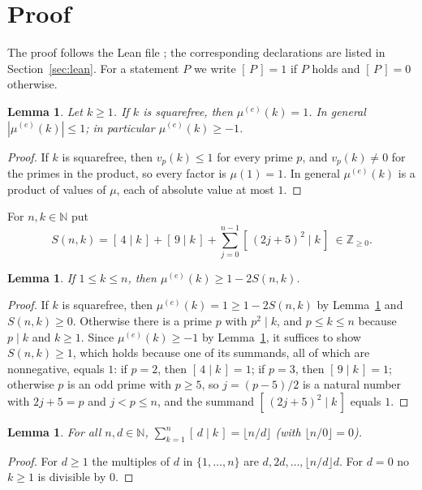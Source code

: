 \documentclass[11pt]{amsart}
\theoremstyle{plain}
\newtheorem{lemma}[theorem]{Lemma}
\theoremstyle{definition}
\newcommand{\N}{\mathbb{N}}
\newcommand{\Z}{\mathbb{Z}}
\newcommand{\mue}{\mu^{(e)}}
\newcommand{\ind}[1]{[\,#1\,]}
\begin{document}
\section{Proof}\label{sec:proof}

The proof follows the Lean file ; the corresponding declarations are listed in Section~\ref{sec:lean}. For a statement $P$ we write $\ind{P}=1$ if $P$ holds and $\ind{P}=0$ otherwise.

\begin{lemma}\label{lem:values}
Let $k\ge1$. If $k$ is squarefree, then $\mue(k)=1$. In general $|\mue(k)|\le1$; in particular $\mue(k)\ge-1$.
\end{lemma}

\begin{proof}
If $k$ is squarefree, then $v_p(k)\le1$ for every prime $p$, and $v_p(k)\ne0$ for the primes in the product, so every factor is $\mu(1)=1$. In general $\mue(k)$ is a product of values of $\mu$, each of absolute value at most $1$.
\end{proof}

For $n,k\in\N$ put
\[
  S(n,k)=\ind{4\mid k}+\ind{9\mid k}+\sum_{j=0}^{n-1}\ind{(2j+5)^2\mid k}\ \in\Z_{\ge0}.
\]

\begin{lemma}\label{lem:pointwise}
If $1\le k\le n$, then $\mue(k)\ge 1-2S(n,k)$.
\end{lemma}

\begin{proof}
If $k$ is squarefree, then $\mue(k)=1\ge1-2S(n,k)$ by Lemma~\ref{lem:values} and $S(n,k)\ge0$. Otherwise there is a prime $p$ with $p^2\mid k$, and $p\le k\le n$ because $p\mid k$ and $k\ge1$. Since $\mue(k)\ge-1$ by Lemma~\ref{lem:values}, it suffices to show $S(n,k)\ge1$, which holds because one of its summands, all of which are nonnegative, equals $1$:
if $p=2$, then $\ind{4\mid k}=1$; if $p=3$, then $\ind{9\mid k}=1$; otherwise $p$ is an odd prime with $p\ge5$, so $j=(p-5)/2$ is a natural number with $2j+5=p$ and $j<p\le n$, and the summand $\ind{(2j+5)^2\mid k}$ equals $1$.
\end{proof}

\begin{lemma}\label{lem:count}
For all $n,d\in\N$, $\sum_{k=1}^{n}\ind{d\mid k}=\lfloor n/d\rfloor$ (with $\lfloor n/0\rfloor=0$).
\end{lemma}

\begin{proof}
For $d\ge1$ the multiples of $d$ in $\{1,\dots,n\}$ are $d,2d,\dots,\lfloor n/d\rfloor d$. For $d=0$ no $k\ge1$ is divisible by $0$.
\end{proof}
\end{document}
